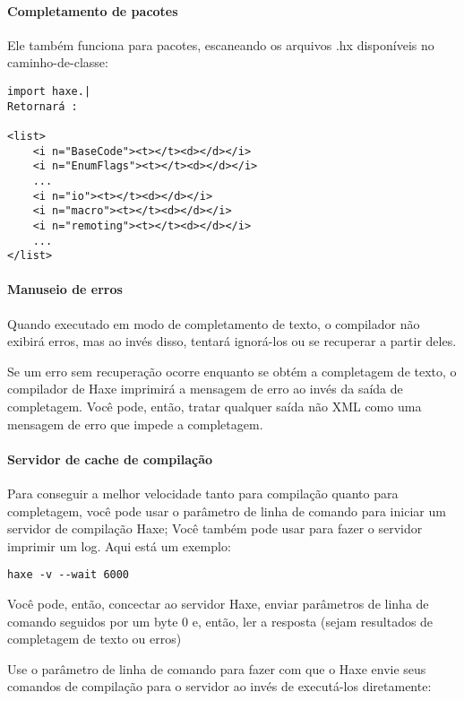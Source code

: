\paragraph{Completamento de pacotes}
Ele também funciona para pacotes, escaneando os arquivos .hx disponíveis no caminho-de-classe:

\begin{lstlisting}
import haxe.|
Retornará :

<list>
    <i n="BaseCode"><t></t><d></d></i>
    <i n="EnumFlags"><t></t><d></d></i>
    ...
    <i n="io"><t></t><d></d></i>
    <i n="macro"><t></t><d></d></i>
    <i n="remoting"><t></t><d></d></i>
    ...
</list>
\end{lstlisting}

\paragraph{Manuseio de erros}
Quando executado em modo de completamento de texto, o compilador não exibirá erros, mas ao invés disso, tentará ignorá-los ou se recuperar a partir deles.

Se um erro sem recuperação ocorre enquanto se obtém a completagem de texto, o compilador de Haxe imprimirá a mensagem de erro ao invés da saída de completagem. Você pode, então, tratar qualquer saída não XML como uma mensagem de erro que impede a completagem.

\paragraph{Servidor de cache de compilação}

Para conseguir a melhor velocidade tanto para compilação quanto para completagem, você pode usar o parâmetro de linha de comando  para iniciar um servidor de compilação Haxe; Você também pode usar  para fazer o servidor imprimir um log. Aqui está um exemplo:

\begin{lstlisting}
haxe -v --wait 6000
\end{lstlisting}

Você pode, então, concectar ao servidor Haxe, enviar parâmetros de linha de comando seguidos por um byte 0 e, então, ler a resposta (sejam resultados de completagem de texto ou erros)

Use o parâmetro de linha de comando  para fazer com que o Haxe envie seus comandos de compilação para o servidor ao invés de executá-los diretamente:

